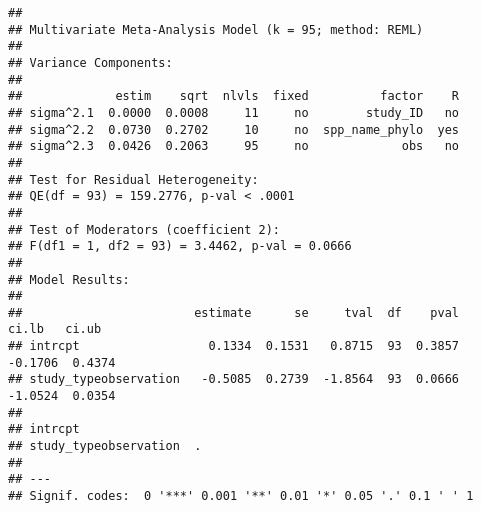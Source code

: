 \documentclass[]{article}
\newenvironment{Shaded}{\begin{snugshade}}{\end{snugshade}}
\newcommand{\KeywordTok}[1]{\textcolor[rgb]{0.13,0.29,0.53}{\textbf{#1}}}
\newcommand{\DataTypeTok}[1]{\textcolor[rgb]{0.13,0.29,0.53}{#1}}
\newcommand{\DecValTok}[1]{\textcolor[rgb]{0.00,0.00,0.81}{#1}}
\newcommand{\StringTok}[1]{\textcolor[rgb]{0.31,0.60,0.02}{#1}}
\newcommand{\CommentTok}[1]{\textcolor[rgb]{0.56,0.35,0.01}{\textit{#1}}}
\newcommand{\OperatorTok}[1]{\textcolor[rgb]{0.81,0.36,0.00}{\textbf{#1}}}
\newcommand{\NormalTok}[1]{#1}
\begin{document}
\begin{Shaded}
\end{Shaded}

\begin{verbatim}
## 
## Multivariate Meta-Analysis Model (k = 95; method: REML)
## 
## Variance Components:
## 
##             estim    sqrt  nlvls  fixed          factor    R 
## sigma^2.1  0.0000  0.0008     11     no        study_ID   no 
## sigma^2.2  0.0730  0.2702     10     no  spp_name_phylo  yes 
## sigma^2.3  0.0426  0.2063     95     no             obs   no 
## 
## Test for Residual Heterogeneity:
## QE(df = 93) = 159.2776, p-val < .0001
## 
## Test of Moderators (coefficient 2):
## F(df1 = 1, df2 = 93) = 3.4462, p-val = 0.0666
## 
## Model Results:
## 
##                        estimate      se     tval  df    pval    ci.lb   ci.ub 
## intrcpt                  0.1334  0.1531   0.8715  93  0.3857  -0.1706  0.4374 
## study_typeobservation   -0.5085  0.2739  -1.8564  93  0.0666  -1.0524  0.0354 
##  
## intrcpt 
## study_typeobservation  . 
## 
## ---
## Signif. codes:  0 '***' 0.001 '**' 0.01 '*' 0.05 '.' 0.1 ' ' 1
\end{verbatim}
\end{document}
